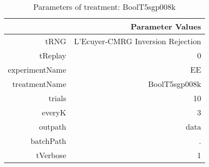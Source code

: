 \begin{table}[ht]
\centering
\begin{tabular}{rr}
  \hline
 & Parameter Values \\ 
  \hline
tRNG & L'Ecuyer-CMRG Inversion Rejection \\ 
  tReplay & 0 \\ 
  experimentName & EE \\ 
  treatmentName & BoolT5sgp008k \\ 
  trials & 10 \\ 
  everyK & 3 \\ 
  outpath & data \\ 
  batchPath & . \\ 
  tVerbose & 1 \\ 
   \hline
\end{tabular}
\caption{ Parameters of treatment: BoolT5sgp008k 
} 
\end{table}
